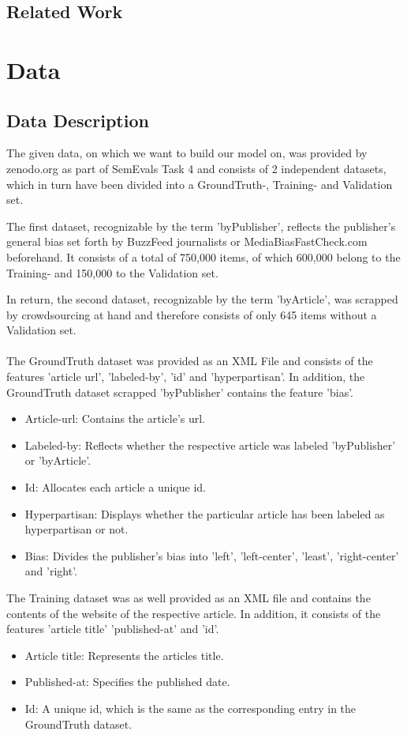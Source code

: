 \documentclass[11pt,titlepage,oneside,openany]{book}
\begin{document}
\section{Related Work}


\chapter{Data}
\label{cha:theory}


\section{Data Description}
 The given data, on which we want to build our model on, was provided by zenodo.org as part of SemEvals Task 4 and consists of 2 independent datasets, which in turn have been divided into a GroundTruth-, Training- and Validation set.
 
 \noindent The first dataset, recognizable by the term 'byPublisher', reflects the publisher's general bias set forth by BuzzFeed journalists or MediaBiasFastCheck.com beforehand. It consists of a total of 750,000 items, of which 600,000 belong to the Training- and 150,000 to the Validation set.
 
 \noindent In return, the second dataset, recognizable by the term 'byArticle', was scrapped by crowdsourcing at hand and therefore consists of only 645 items without a Validation set.\\
 \\
 The GroundTruth dataset was provided as an XML File and consists of the features 'article url', 'labeled-by', 'id' and 'hyperpartisan'. In addition, the GroundTruth dataset scrapped 'byPublisher' contains the feature 'bias'.
\begin{itemize}
	\item Article-url: Contains the article's url.
	\item Labeled-by: Reflects whether the respective article was labeled 'byPublisher' or 'byArticle'.
	\item Id: Allocates each article a unique id.
	\item Hyperpartisan: Displays whether the particular article has been labeled as hyperpartisan or not.
	\item Bias: Divides the publisher's bias into 'left', 'left-center', 'least', 'right-center' and 'right'.
\end{itemize}
 The Training dataset was as well provided as an XML file and contains the contents of the website of the respective article. In addition, it consists of the features 'article title' 'published-at' and 'id'.
\begin{itemize}
	\item Article title: Represents the articles title.
	\item Published-at: Specifies the published date.
	\item Id: A unique id, which is the same as the corresponding entry in the GroundTruth dataset.
\end{itemize}
\end{document}
